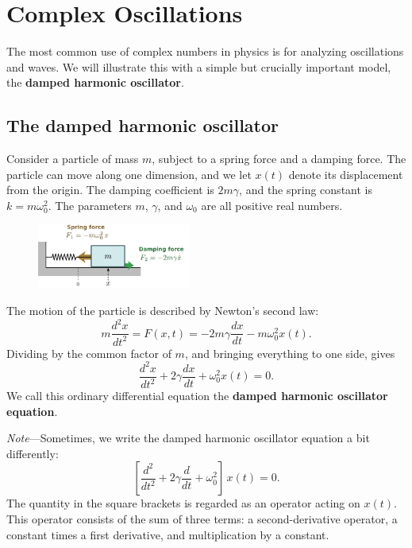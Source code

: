 \documentclass[10pt,a4paper]{article}
\begin{document}
\setcounter{page}{30}
    
\section{Complex Oscillations}
\label{complex-oscillations}

The most common use of complex numbers in physics is for analyzing
oscillations and waves. We will illustrate this with a simple but
crucially important model, the \textbf{damped harmonic oscillator}.

\subsection{The damped harmonic oscillator}
\label{the-damped-harmonic-oscillator}

Consider a particle of mass $m$, subject to a spring force and a
damping force. The particle can move along one dimension, and we let
$x(t)$ denote its displacement from the origin. The damping
coefficient is $2m \gamma$, and the spring constant is
$k = m\omega_0^2$. The parameters $m$, $\gamma$, and $\omega_0$
are all positive real numbers.

\begin{figure}[h]
  \centering\includegraphics[width=0.45\textwidth]{oscillator}
\end{figure}

\noindent
The motion of the particle is described by Newton's second law:
\begin{equation}
m \frac{d^2 x}{dt^2} = F(x,t) = - 2m\gamma \frac{dx}{dt} - m\omega_0^2 x(t).
\end{equation}
Dividing by the common factor of $m$, and bringing everything to one
side, gives
\begin{equation}
  \frac{d^2 x}{dt^2} + 2\gamma \frac{dx}{dt} + \omega_0^2 x(t) = 0.
\end{equation}
We call this ordinary differential equation the \textbf{damped harmonic
oscillator equation}.

\begin{framed} \noindent
  \textit{Note}---Sometimes, we write the damped harmonic oscillator
  equation a bit differently:
  \begin{equation*}
    \left[\frac{d^2}{dt^2} + 2\gamma \frac{d}{dt} + \omega_0^2 \right]\, x(t) = 0.
  \end{equation*}
  The quantity in the square brackets is regarded as an operator
  acting on $x(t)$. This operator consists of the sum of three terms:
  a second-derivative operator, a constant times a first derivative,
  and multiplication by a constant.
\end{framed}
\end{document}
